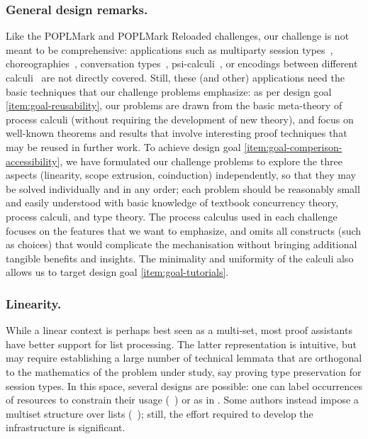 \documentclass[runningheads]{llncs}
\begin{document}
\subsubsection{General design remarks.}
Like the POPLMark and POPLMark Reloaded challenges, our challenge is not meant to be comprehensive:
applications such as multiparty session types~\cite{10.1145/2827695,10.1145/3290343}, choreographies~\cite{DBLP:journals/jar/CruzFilipeMP23}, conversation types~\cite{DBLP:journals/tcs/CairesV10}, psi-calculi~\cite{lmcs:696}, or encodings between different calculi~\cite{DBLP:journals/iandc/Gorla10,DBLP:conf/forte/CairesP16,DBLP:journals/iandc/DardhaGS17,DBLP:conf/ecoop/ScalasDHY17,DBLP:journals/iandc/KouzapasPY19,10.1145/3479394.3479407} are not directly covered.
Still, these (and other) applications need the basic techniques that our challenge problems emphasize: as per design goal \ref{item:goal-reusability}, our problems are drawn from the basic meta-theory of process calculi (without requiring the development of new theory), and focus on well-known theorems and results that involve interesting proof techniques that may be reused in further work.
To achieve design goal \ref{item:goal-comperison-accessibility},
we have formulated our challenge problems to explore the three aspects (linearity, scope extrusion, coinduction) independently, so that they may be solved individually and in any order;
each problem should be reasonably small and easily understood with basic knowledge of textbook concurrency theory, process calculi, and type theory.  The process calculus used in each challenge
focuses on the features that we want to emphasize, and omits all constructs
(such as choices) that would complicate the mechanisation without bringing additional tangible
benefits and insights. 
The minimality and uniformity of the calculi also allows us to target design
goal \ref{item:goal-tutorials}.

\subsubsection{Linearity.}
While a linear context is perhaps best seen as a multi-set, most proof assistants have better support for list processing.
The latter representation is intuitive, but may require establishing a large number of technical lemmata that are orthogonal to the mathematics of the problem under study, say proving type preservation for session types.
In this space, several designs are possible: one can label occurrences of resources to constrain their usage (\eg~\cite{CicconeP20}) or  as in \cite{Castro2020}.
Some authors instead impose a multiset structure over lists (\eg~\cite{ChaudhuriLR19,Danielsson12}); still, the effort required to develop the infrastructure is significant.
\end{document}
